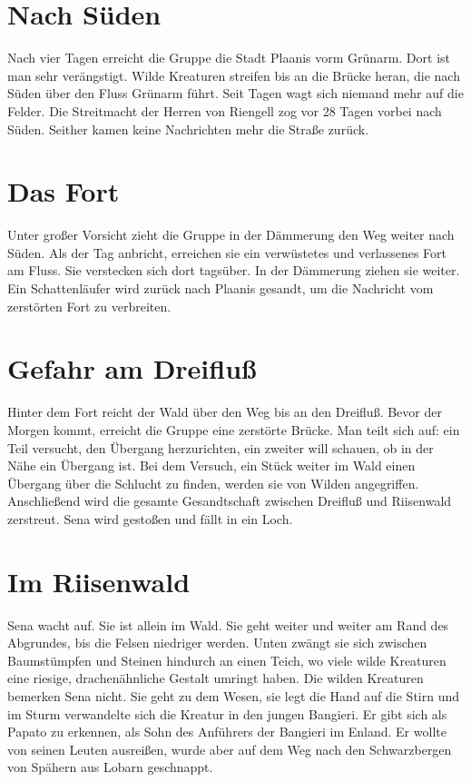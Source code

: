 \documentclass[12pt,a4paper,onecolumn,twoside,ngerman]{book}
\newcommand{\Sena}{Sena}
\newcommand{\Bangiri}{Bangieri}
\newcommand{\Papato}{Papato}
\newcommand{\Enland}{Enland}
\newcommand{\Schattenlaufer}{Schattenläufer}
\newcommand{\Lobarn}{Lobarn}
\newcommand{\Rhingell}{Riengell}
\newcommand{\Dreifluss}{Dreifluß}
\newcommand{\Planis}{Plaanis}
\newcommand{\Grunarm}{Grünarm}
\newcommand{\Grunland}{Grünland}
\newcommand{\Riesenwald}{Riisenwald}
\begin{document}
{\section{Nach Süden}
Nach vier Tagen erreicht die Gruppe die Stadt {\Planis} vorm {\Grunarm}. Dort ist man sehr verängstigt. Wilde Kreaturen streifen bis an die Brücke heran, die nach Süden über den Fluss {\Grunarm} führt. Seit Tagen wagt sich niemand mehr auf die Felder. Die Streitmacht der Herren von {\Rhingell} zog vor 28 Tagen vorbei nach Süden. Seither kamen keine Nachrichten mehr die Straße zurück.
 
\section{Das Fort}
Unter großer Vorsicht zieht die Gruppe in der Dämmerung den Weg weiter nach Süden.\linebreak
Als der Tag anbricht, erreichen sie ein verwüstetes und verlassenes Fort am Fluss. Sie verstecken sich dort tagsüber. In der Dämmerung ziehen sie weiter. Ein  {\Schattenlaufer} wird zurück nach {\Planis} gesandt, um die Nachricht vom zerstörten Fort zu verbreiten.

\section{Gefahr am \Dreifluss}
Hinter dem Fort reicht der Wald über den Weg bis an den {\Dreifluss}. Bevor der Morgen kommt, erreicht die Gruppe eine zerstörte Brücke.\linebreak
Man teilt sich auf: ein Teil versucht, den Übergang herzurichten, ein zweiter will schauen, ob in der Nähe ein Übergang ist. Bei dem Versuch, ein Stück weiter im Wald einen Übergang über die Schlucht zu finden, werden sie von Wilden angegriffen. Anschließend wird die gesamte Gesandtschaft zwischen {\Dreifluss} und {\Riesenwald} zerstreut.  {\Sena} wird gestoßen und fällt in ein Loch.

\section{Im \Riesenwald}
{\Sena} wacht auf. Sie ist allein im Wald. Sie geht weiter und weiter am Rand des Abgrundes, bis die Felsen niedriger werden. Unten zwängt sie sich zwischen Baumstümpfen und Steinen hindurch an einen Teich, wo viele wilde Kreaturen eine riesige, drachenähnliche Gestalt umringt haben.\linebreak
Die wilden Kreaturen bemerken {\Sena} nicht. Sie geht zu dem Wesen, sie legt die Hand auf die Stirn und im Sturm verwandelte sich die Kreatur in den jungen {\Bangiri}. Er gibt sich als {\Papato} zu erkennen, als Sohn des Anführers der {\Bangiri} im {\Enland}. Er wollte von seinen Leuten ausreißen, wurde aber auf dem Weg nach den Schwarzbergen von Spähern aus {\Lobarn} geschnappt. 

}
\end{document}
